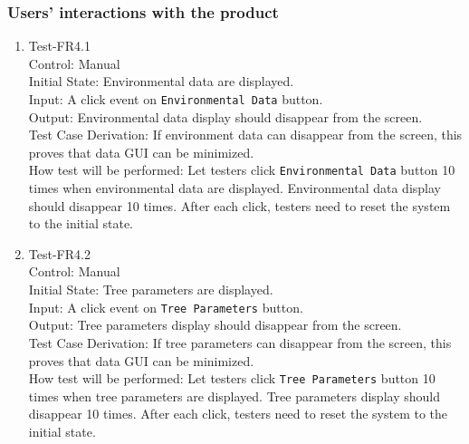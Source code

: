 \documentclass[12pt, titlepage]{article}
\begin{document}
\subsubsection{Users' interactions with the product}
\begin{enumerate}
\item{Test-FR4.1\\}
Control: Manual\\ 

Initial State: Environmental data are displayed.\\

Input: A click event on \verb|Environmental Data| button.\\

Output: Environmental data display should disappear from the screen.\\

Test Case Derivation: If environment data can disappear from the 
screen, this proves that data GUI can be minimized.\\
     
How test will be performed: Let testers click 
\verb|Environmental Data| button 10 times when environmental data 
are displayed. Environmental data display should disappear 10 times.
After each click, testers need to reset the system to the initial 
state.

\item{Test-FR4.2\\}
Control: Manual\\ 

Initial State: Tree parameters are displayed.\\

Input: A click event on \verb|Tree Parameters| button.\\

Output: Tree parameters display should disappear from the screen.\\

Test Case Derivation: If tree parameters can disappear from the 
screen, this proves that data GUI can be minimized.\\
     
How test will be performed: Let testers click 
\verb|Tree Parameters| button 10 times when tree parameters 
are displayed. Tree parameters display should disappear 10 times.
After each click, testers need to reset the system to the initial 
state.


\end{enumerate}
\end{document}
